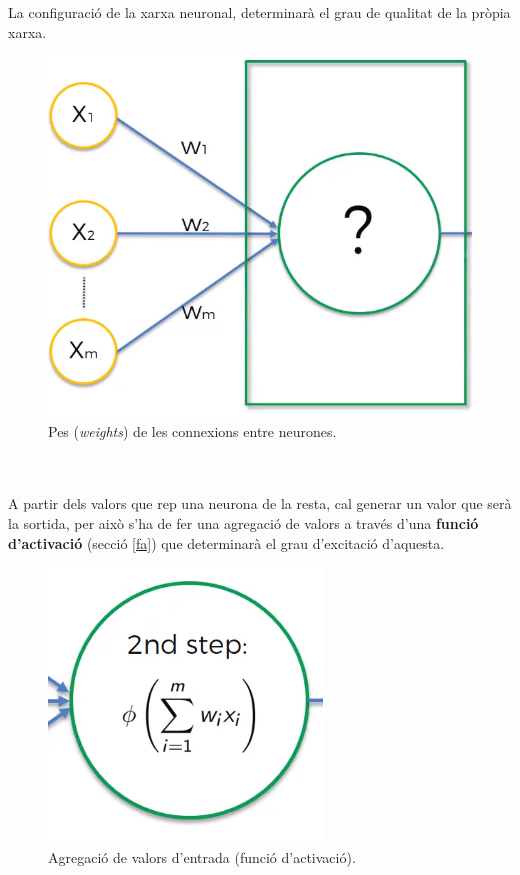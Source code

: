 \documentclass[12pt]{article}
\begin{document}
\\\\La configuració de la xarxa neuronal, determinarà el grau de qualitat de la pròpia xarxa.
\begin{figure}[h!]
	\centering
	\includegraphics[scale=0.2]{imatges/neurona/6pes.png}
	\caption{Pes (\textit{weights}) de les connexions entre neurones.}
\end{figure}
\\\\A partir dels valors que rep una neurona de la resta, cal generar un valor que serà la sortida, per això s'ha de fer una agregació de valors a través d'una \textbf{funció d'activació} (secció \ref{fa}) que determinarà el grau d'excitació d'aquesta.
\begin{figure}[h!]
	\centering
	\includegraphics[scale=0.4]{imatges/neurona/7activacio.png}
	\caption{Agregació de valors d'entrada (funció d'activació).}
\end{figure}
\end{document}
